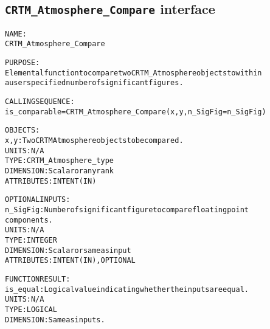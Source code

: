 \subsection{\texttt{CRTM\_Atmosphere\_Compare} interface}
  \label{sec:CRTM_Atmosphere_Compare_interface}
  \begin{alltt}
  NAME:
        CRTM_Atmosphere_Compare
 
  PURPOSE:
        Elemental function to compare two CRTM_Atmosphere objects to within
        a user specified number of significant figures.
 
  CALLING SEQUENCE:
        is_comparable = CRTM_Atmosphere_Compare( x, y, n_SigFig=n_SigFig )
 
  OBJECTS:
        x, y:          Two CRTM Atmosphere objects to be compared.
                       UNITS:      N/A
                       TYPE:       CRTM_Atmosphere_type
                       DIMENSION:  Scalar or any rank
                       ATTRIBUTES: INTENT(IN)
 
  OPTIONAL INPUTS:
        n_SigFig:      Number of significant figure to compare floating point
                       components.
                       UNITS:      N/A
                       TYPE:       INTEGER
                       DIMENSION:  Scalar or same as input
                       ATTRIBUTES: INTENT(IN), OPTIONAL
 
  FUNCTION RESULT:
        is_equal:      Logical value indicating whether the inputs are equal.
                       UNITS:      N/A
                       TYPE:       LOGICAL
                       DIMENSION:  Same as inputs.
  \end{alltt}
